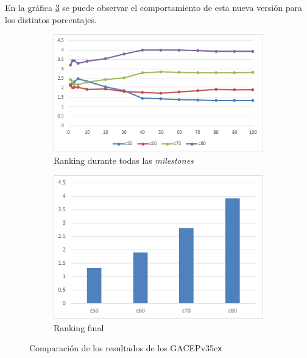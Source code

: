 En la gráfica \ref{fig:GACEPv35} se puede observar el comportamiento de esta nueva versión para los distintos porcentajes.
 
\begin{figure}[h]
     \centering
     \begin{subfigure}[b]{0.45\textwidth}
         \centering
         \includegraphics[width=\textwidth]{imagenes/Experimental/GACEPv35.png}
         \caption{Ranking durante todas las \textit{milestones}}
         \label{fig:GACEPv35_lineas}
     \end{subfigure}
     \hfill
     \begin{subfigure}[b]{0.45\textwidth}
         \centering
         \includegraphics[width=\textwidth]{imagenes/Experimental/barras/GACEPv35.png}
         \caption{Ranking final}
         \label{fig:GACEPv35_barras}
     \end{subfigure}
        \caption{Comparación de los resultados de los GACEPv35c\texttt{x}}
        \label{fig:GACEPv35}
\end{figure}

